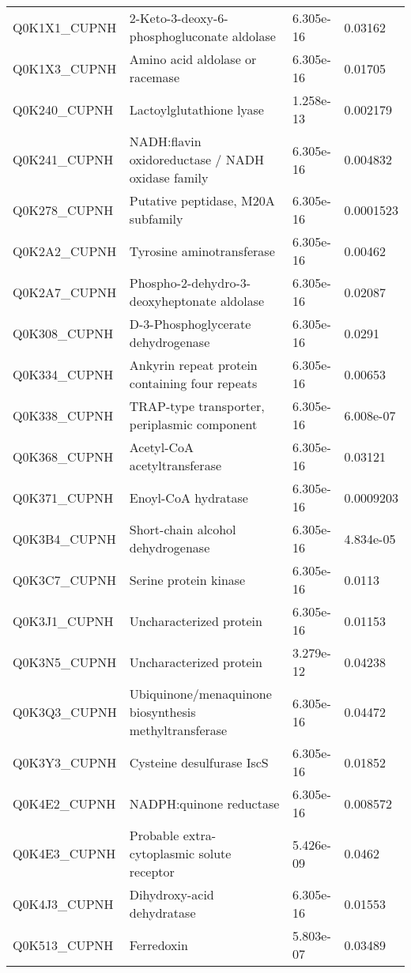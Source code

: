 \begin{center}
\begin{longtable}{ l l l l }
Q0K1X1\_CUPNH & 2-Keto-3-deoxy-6-phosphogluconate aldolase& 6.305e-16 & 0.03162 \\ [0.5ex]
Q0K1X3\_CUPNH & Amino acid aldolase or racemase& 6.305e-16 & 0.01705 \\ [0.5ex]
Q0K240\_CUPNH & Lactoylglutathione lyase& 1.258e-13 & 0.002179 \\ [0.5ex]
Q0K241\_CUPNH & NADH:flavin oxidoreductase / NADH oxidase family& 6.305e-16 & 0.004832 \\ [0.5ex]
Q0K278\_CUPNH & Putative peptidase, M20A subfamily& 6.305e-16 & 0.0001523 \\ [0.5ex]
Q0K2A2\_CUPNH & Tyrosine aminotransferase& 6.305e-16 & 0.00462 \\ [0.5ex]
Q0K2A7\_CUPNH & Phospho-2-dehydro-3-deoxyheptonate aldolase& 6.305e-16 & 0.02087 \\ [0.5ex]
Q0K308\_CUPNH & D-3-Phosphoglycerate dehydrogenase& 6.305e-16 & 0.0291 \\ [0.5ex]
Q0K334\_CUPNH & Ankyrin repeat protein containing four repeats& 6.305e-16 & 0.00653 \\ [0.5ex]
Q0K338\_CUPNH & TRAP-type transporter, periplasmic component& 6.305e-16 & 6.008e-07 \\ [0.5ex]
Q0K368\_CUPNH & Acetyl-CoA acetyltransferase& 6.305e-16 & 0.03121 \\ [0.5ex]
Q0K371\_CUPNH & Enoyl-CoA hydratase& 6.305e-16 & 0.0009203 \\ [0.5ex]
Q0K3B4\_CUPNH & Short-chain alcohol dehydrogenase& 6.305e-16 & 4.834e-05 \\ [0.5ex]
Q0K3C7\_CUPNH & Serine protein kinase& 6.305e-16 & 0.0113 \\ [0.5ex]
Q0K3J1\_CUPNH & Uncharacterized protein& 6.305e-16 & 0.01153 \\ [0.5ex]
Q0K3N5\_CUPNH & Uncharacterized protein& 3.279e-12 & 0.04238 \\ [0.5ex]
Q0K3Q3\_CUPNH & Ubiquinone/menaquinone biosynthesis methyltransferase& 6.305e-16 & 0.04472 \\ [0.5ex]
Q0K3Y3\_CUPNH & Cysteine desulfurase IscS& 6.305e-16 & 0.01852 \\ [0.5ex]
Q0K4E2\_CUPNH & NADPH:quinone reductase & 6.305e-16 & 0.008572 \\ [0.5ex]
Q0K4E3\_CUPNH & Probable extra-cytoplasmic solute receptor& 5.426e-09 & 0.0462 \\ [0.5ex]
Q0K4J3\_CUPNH & Dihydroxy-acid dehydratase& 6.305e-16 & 0.01553 \\ [0.5ex]
Q0K513\_CUPNH & Ferredoxin& 5.803e-07 & 0.03489 \\ [0.5ex]

\end{longtable}
\end{center}
